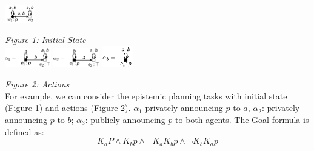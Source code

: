 \documentclass[10pt,legal]{article} %
\begin{document}
\begin{multicols}{2}
\includegraphics[width=0.1\textwidth]{initialstate.png}
\par\small\textit{Figure 1: Initial State}
\\
\includegraphics[width=0.15\textwidth]{a1.png}
\includegraphics[width=0.15\textwidth]{a2.png}
\includegraphics[width=0.1\textwidth]{a3.png} 
\par\small\textit{Figure 2: Actions}\\
For example, we can consider the epistemic planning tasks with initial state (Figure 1) and actions (Figure 2). $\alpha_1$ privately announcing $p$ to $a$,  $\alpha_2$: privately announcing $p$ to $b$; $\alpha_3$: publicly announcing $p$ to both agents. The Goal formula is defined as:
\begin{equation}
K_a P \wedge	 K_b p \wedge	 \neg K_a K_b p \wedge  \neg K_b K_a p
\end{equation}


\end{multicols}
\end{document}
